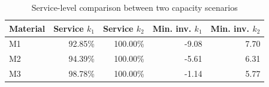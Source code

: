 \begin{table}[H]
\centering
\caption{Service-level comparison between two capacity scenarios}
\label{tab:demo-v1-scenario-compare}
\begin{tabular}{lrrrr}
\toprule
Material & Service $k_1$ & Service $k_2$ & Min. inv. $k_1$ & Min. inv. $k_2$ \\
\midrule
M1 & 92.85\% & 100.00\% & -9.08 & 7.70 \\
M2 & 94.39\% & 100.00\% & -5.61 & 6.31 \\
M3 & 98.78\% & 100.00\% & -1.14 & 5.77 \\
\bottomrule
\end{tabular}
\end{table}
